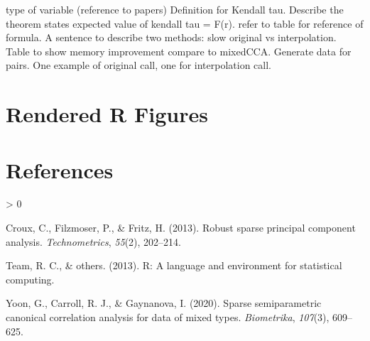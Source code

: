 \documentclass[10pt,a4paper,onecolumn]{article}
\newlength{\cslhangindent}
\newenvironment{CSLReferences}[2] %
 {%
  \setlength{\parindent}{0pt}
  \ifodd #1 \everypar{\setlength{\hangindent}{\cslhangindent}}\ignorespaces\fi
  \ifnum #2 > 0
  \setlength{\parskip}{#2\baselineskip}
  \fi
 }%
 {}
\begin{document}
type of variable (reference to papers) Definition for Kendall tau.
Describe the theorem states expected value of kendall tau = F(r). refer
to table for reference of formula. A sentence to describe two methods:
slow original vs interpolation. Table to show memory improvement compare
to mixedCCA. Generate data for pairs. One example of original call, one
for interpolation call.

\hypertarget{rendered-r-figures}{%
\section{Rendered R Figures}\label{rendered-r-figures}}

\hypertarget{references}{%
\section*{References}\label{references}}

\hypertarget{refs}{}
\begin{CSLReferences}{1}{0}
\leavevmode\hypertarget{ref-croux2013robust}{}%
Croux, C., Filzmoser, P., \& Fritz, H. (2013). Robust sparse principal
component analysis. \emph{Technometrics}, \emph{55}(2), 202--214.

\leavevmode\hypertarget{ref-team2013r}{}%
Team, R. C., \& others. (2013). R: A language and environment for
statistical computing.

\leavevmode\hypertarget{ref-yoon2020sparse}{}%
Yoon, G., Carroll, R. J., \& Gaynanova, I. (2020). Sparse semiparametric
canonical correlation analysis for data of mixed types.
\emph{Biometrika}, \emph{107}(3), 609--625.

\end{CSLReferences}
\end{document}
